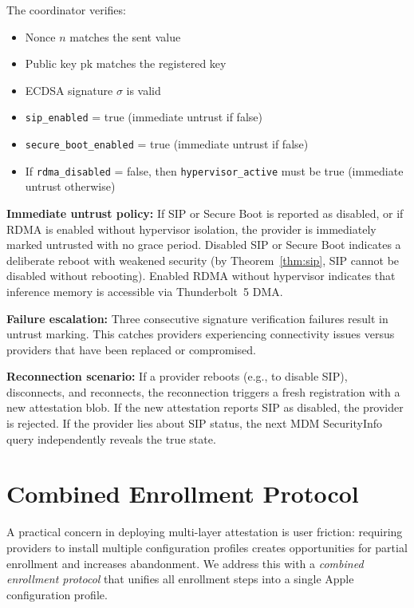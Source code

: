 \documentclass[10pt,twocolumn,letterpaper]{article}
\begin{document}
The coordinator verifies:
\begin{itemize}[leftmargin=*,itemsep=1pt]
    \item Nonce $n$ matches the sent value
    \item Public key $\text{pk}$ matches the registered key
    \item ECDSA signature $\sigma$ is valid
    \item \texttt{sip\_enabled} = true (immediate untrust if false)
    \item \texttt{secure\_boot\_enabled} = true (immediate untrust if false)
    \item If \texttt{rdma\_disabled} = false, then \texttt{hypervisor\_active} must be true (immediate untrust otherwise)
\end{itemize}

\textbf{Immediate untrust policy:} If SIP or Secure Boot is reported as disabled, or if RDMA is enabled without hypervisor isolation, the provider is immediately marked untrusted with no grace period. Disabled SIP or Secure Boot indicates a deliberate reboot with weakened security (by Theorem~\ref{thm:sip}, SIP cannot be disabled without rebooting). Enabled RDMA without hypervisor indicates that inference memory is accessible via Thunderbolt~5 DMA.

\textbf{Failure escalation:} Three consecutive signature verification failures result in untrust marking. This catches providers experiencing connectivity issues versus providers that have been replaced or compromised.

\textbf{Reconnection scenario:} If a provider reboots (e.g., to disable SIP), disconnects, and reconnects, the reconnection triggers a fresh registration with a new attestation blob. If the new attestation reports SIP as disabled, the provider is rejected. If the provider lies about SIP status, the next MDM SecurityInfo query independently reveals the true state.

\section{Combined Enrollment Protocol}
\label{sec:enrollment}

A practical concern in deploying multi-layer attestation is user friction: requiring providers to install multiple configuration profiles creates opportunities for partial enrollment and increases abandonment. We address this with a \emph{combined enrollment protocol} that unifies all enrollment steps into a single Apple configuration profile.
\end{document}
